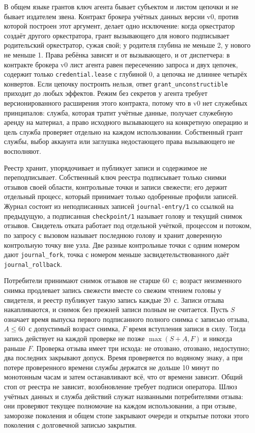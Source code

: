 \documentclass[10pt,a4paper]{article}
\begin{document}
В общем языке грантов ключ агента бывает субъектом и листом цепочки и не бывает издателем звена. Контракт брокера учётных данных версии v0, против которой построен этот аргумент, делает одно исключение: когда оркестратор создаёт другого оркестратора, грант вызывающего для нового подписывает родительский оркестратор, сужая свой; у родителя глубина не меньше 2, у нового не меньше 1. Права ребёнка зависят и от вызывающего, и от диспетчера: в контракте брокера v0 лист агента равен пересечению запроса и двух цепочек, содержит только \texttt{credential.lease} с глубиной 0, а цепочка не длиннее четырёх конвертов. Если цепочку построить нельзя, ответ \texttt{grant\_unconstructible} приходит до любых эффектов. Режим без секретов у агента требует версионированного расширения этого контракта, потому что в v0 нет служебных принципалов: служба, которая тратит учётные данные, получает служебную аренду на материал, а право исходного вызывающего на конкретную операцию и цель служба проверяет отдельно на каждом использовании. Собственный грант службы, выбор аккаунта или заглушка недостающего права вызывающего не восполняют.

Реестр хранит, упорядочивает и публикует записи и содержимое не переподписывает. Собственный ключ реестра подписывает только снимки отзывов своей области, контрольные точки и записи свежести; его держит отдельный процесс, который принимает только одобренные профили записей. Журнал состоит из неподписанных записей \texttt{journal-entry/1} со ссылкой на предыдущую, а подписанная \texttt{checkpoint/1} называет голову и текущий снимок отзывов. Свидетель отката работает под отдельной учёткой, процессом и потоком, по запросу с вызовом называет последнюю голову и хранит доверенную контрольную точку вне узла. Две разные контрольные точки с одним номером дают \texttt{journal\_fork}, точка с номером меньше засвидетельствованного даёт \texttt{journal\_rollback}.

Потребители принимают снимок отзывов не старше 60~с; возраст неизменного снимка продлевает запись свежести вместе со свежим чтением головы у свидетеля, и реестр публикует такую запись каждые 20~с. Записи отзыва накапливаются, и снимок без прежней записи полным не считается. Пусть $S$ означает время выпуска первого подписанного полного снимка с записью отзыва, $A\le60$~с допустимый возраст снимка, $F$ время вступления записи в силу. Тогда запись действует на каждой проверке не позже $\max(S+A,F)$ и никогда раньше $F$. Проверка отзыва имеет три исхода: не отозвано, отозвано, недоступно; два последних закрывают допуск. Время проверяется по водяному знаку, а при потере проверенного времени службы держатся не дольше 10 минут по монотонным часам и затем останавливают всё, что от времени зависит. Общий стоп от реестра не зависит, возобновление требует подписи оператора. Шлюз учётных данных и служба действий служат названными потребителями отзыва: они проверяют текущее полномочие на каждом использовании, а при отзыве, заморозке поколения и общем стопе закрывают очереди и открытые потоки этого поколения с долговечной записью закрытия.
\end{document}
